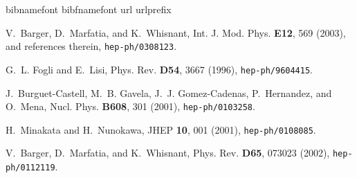 \documentclass[12pt,a4paper]{article}
\begin{document}
\begin{thebibliography}{10}
\expandafter\ifx\csname bibnamefont\endcsname\relax
  \def\bibnamefont#1{#1}\fi
\expandafter\ifx\csname bibfnamefont\endcsname\relax
  \def\bibfnamefont#1{#1}\fi
\expandafter\ifx\csname url\endcsname\relax
  \def\url#1{\texttt{#1}}\fi
\expandafter\ifx\csname urlprefix\endcsname\relax\def\urlprefix{URL }\fi
\providecommand{\bibinfo}[2]{#2}
\providecommand{\eprint}[2][]{\url{#2}}

\bibinfo{author}{\bibfnamefont{V.}~\bibnamefont{Barger}},
  \bibinfo{author}{\bibfnamefont{D.}~\bibnamefont{Marfatia}}, \bibnamefont{and}
  \bibinfo{author}{\bibfnamefont{K.}~\bibnamefont{Whisnant}},
  \bibinfo{journal}{Int. J. Mod. Phys.} \textbf{\bibinfo{volume}{E12}},
  \bibinfo{pages}{569} (\bibinfo{year}{2003}), \bibinfo{note}{and references
  therein}, \eprint{hep-ph/0308123}.

\bibinfo{author}{\bibfnamefont{G.~L.} \bibnamefont{Fogli}} \bibnamefont{and}
  \bibinfo{author}{\bibfnamefont{E.}~\bibnamefont{Lisi}},
  \bibinfo{journal}{Phys. Rev.} \textbf{\bibinfo{volume}{D54}},
  \bibinfo{pages}{3667} (\bibinfo{year}{1996}), \eprint{hep-ph/9604415}.

\bibinfo{author}{\bibfnamefont{J.}~\bibnamefont{Burguet-Castell}},
  \bibinfo{author}{\bibfnamefont{M.~B.} \bibnamefont{Gavela}},
  \bibinfo{author}{\bibfnamefont{J.~J.} \bibnamefont{Gomez-Cadenas}},
  \bibinfo{author}{\bibfnamefont{P.}~\bibnamefont{Hernandez}},
  \bibnamefont{and} \bibinfo{author}{\bibfnamefont{O.}~\bibnamefont{Mena}},
  \bibinfo{journal}{Nucl. Phys.} \textbf{\bibinfo{volume}{B608}},
  \bibinfo{pages}{301} (\bibinfo{year}{2001}),
  \eprint[http://arXiv.org/abs]{hep-ph/0103258}.

\bibinfo{author}{\bibfnamefont{H.}~\bibnamefont{Minakata}} \bibnamefont{and}
  \bibinfo{author}{\bibfnamefont{H.}~\bibnamefont{Nunokawa}},
  \bibinfo{journal}{JHEP} \textbf{\bibinfo{volume}{10}}, \bibinfo{pages}{001}
  (\bibinfo{year}{2001}), \eprint[http://arXiv.org/abs]{hep-ph/0108085}.

\bibinfo{author}{\bibfnamefont{V.}~\bibnamefont{Barger}},
  \bibinfo{author}{\bibfnamefont{D.}~\bibnamefont{Marfatia}}, \bibnamefont{and}
  \bibinfo{author}{\bibfnamefont{K.}~\bibnamefont{Whisnant}},
  \bibinfo{journal}{Phys. Rev.} \textbf{\bibinfo{volume}{D65}},
  \bibinfo{pages}{073023} (\bibinfo{year}{2002}),
  \eprint[http://arXiv.org/abs]{hep-ph/0112119}.


\end{thebibliography}
\end{document}
